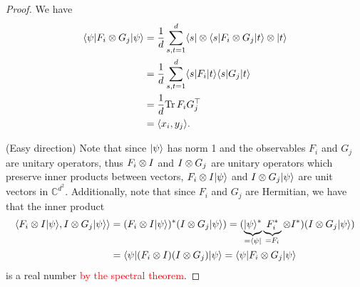 \begin{proof}
		We have
		\begin{align*}
			\langle {\psi} \vert F_i\otimes G_j \vert {\psi} \rangle &= \frac{1}{d} \sum_{s,t=1}^d \langle {s} \vert\otimes\langle {s} \vert F_i\otimes G_j \vert {t} \rangle\otimes \vert {t} \rangle \\
			&= \frac{1}{d} \sum_{s,t=1}^d \langle {s} \vert F_i \vert {t} \rangle \langle {s} \vert G_j \vert {t} \rangle \\
			&= \frac{1}{d} \textup{Tr} \, {F_iG_j^\top} \\
			&= \langle{x_i},{y_j}\rangle.
		\end{align*}
		
		(Easy direction) Note that since $\vert {\psi} \rangle$ has norm 1 and the observables $F_i$ and $G_j$ are unitary operators, thus $F_i\otimes I$ and $I\otimes G_j$ are unitary operators which preserve inner products between vectors, $F_i\otimes I \vert {\psi} \rangle$ and $I\otimes G_j\vert {\psi} \rangle$ are unit vectors in $\mathbb{C}^{d^2}$. Additionally, note that since $F_i$ and $G_j$ are Hermitian, we have that the inner product
		\begin{align*}
			\sclr{F_i\tensor I \dr{\psi}}{I\tensor G_j \dr{\psi}} &= (F_i\tensor I \dr{\psi})^\ast(I\tensor G_j \dr{\psi}) 
			= (\underbrace{\dr{\psi}^\ast}_{=\dl{\psi}}\underbrace{F_i^\ast}_{=F_i}\tensor I^\ast)(I\tensor G_j \dr{\psi}) \\
			&= \dl{\psi}(F_i\tensor I)(I \tensor G_j) \dr{\psi}	%
			= \dl{\psi} F_i\tensor G_j \dr{\psi}
		\end{align*}
		is a real number \textcolor{red}{by the spectral theorem}.
%		

\end{proof}
